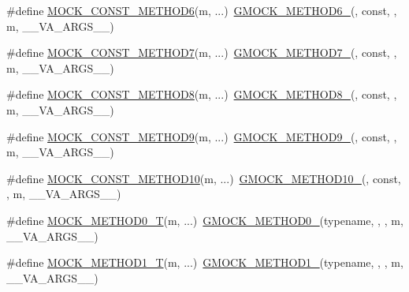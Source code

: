 \begin{DoxyCompactItemize}
\item 
\#define \hyperlink{gmock-generated-function-mockers_8h_a5081a185ba264d599357398952c23af1}{M\+O\+C\+K\+\_\+\+C\+O\+N\+S\+T\+\_\+\+M\+E\+T\+H\+O\+D6}(m, ...)~\hyperlink{gmock-generated-function-mockers_8h_ad0ca7f6973a076d0af4c953f8ed91842}{G\+M\+O\+C\+K\+\_\+\+M\+E\+T\+H\+O\+D6\+\_\+}(, const, , m, \+\_\+\+\_\+\+V\+A\+\_\+\+A\+R\+G\+S\+\_\+\+\_\+)
\item 
\#define \hyperlink{gmock-generated-function-mockers_8h_a0f0e63ed14beab1d85f0160bdbed9930}{M\+O\+C\+K\+\_\+\+C\+O\+N\+S\+T\+\_\+\+M\+E\+T\+H\+O\+D7}(m, ...)~\hyperlink{gmock-generated-function-mockers_8h_ab98a8399ba62b53b375c2807f4d39d2f}{G\+M\+O\+C\+K\+\_\+\+M\+E\+T\+H\+O\+D7\+\_\+}(, const, , m, \+\_\+\+\_\+\+V\+A\+\_\+\+A\+R\+G\+S\+\_\+\+\_\+)
\item 
\#define \hyperlink{gmock-generated-function-mockers_8h_a614ee58b7c9ab72e90c850d4bb97a502}{M\+O\+C\+K\+\_\+\+C\+O\+N\+S\+T\+\_\+\+M\+E\+T\+H\+O\+D8}(m, ...)~\hyperlink{gmock-generated-function-mockers_8h_aa84a36427c44505207b7cad5dec7ad67}{G\+M\+O\+C\+K\+\_\+\+M\+E\+T\+H\+O\+D8\+\_\+}(, const, , m, \+\_\+\+\_\+\+V\+A\+\_\+\+A\+R\+G\+S\+\_\+\+\_\+)
\item 
\#define \hyperlink{gmock-generated-function-mockers_8h_ab7429646bacf56a7d560a3d81d497880}{M\+O\+C\+K\+\_\+\+C\+O\+N\+S\+T\+\_\+\+M\+E\+T\+H\+O\+D9}(m, ...)~\hyperlink{gmock-generated-function-mockers_8h_aa820171a19cc587c247dbe05cbffc55f}{G\+M\+O\+C\+K\+\_\+\+M\+E\+T\+H\+O\+D9\+\_\+}(, const, , m, \+\_\+\+\_\+\+V\+A\+\_\+\+A\+R\+G\+S\+\_\+\+\_\+)
\item 
\#define \hyperlink{gmock-generated-function-mockers_8h_a4f16ede0ef660fb6dc49e5f5d226fbf9}{M\+O\+C\+K\+\_\+\+C\+O\+N\+S\+T\+\_\+\+M\+E\+T\+H\+O\+D10}(m, ...)~\hyperlink{gmock-generated-function-mockers_8h_a81a48223a8771de36ef92ac6d56f6e81}{G\+M\+O\+C\+K\+\_\+\+M\+E\+T\+H\+O\+D10\+\_\+}(, const, , m, \+\_\+\+\_\+\+V\+A\+\_\+\+A\+R\+G\+S\+\_\+\+\_\+)
\item 
\#define \hyperlink{gmock-generated-function-mockers_8h_a55a5a1a22cec416ead5605a2da39eec8}{M\+O\+C\+K\+\_\+\+M\+E\+T\+H\+O\+D0\+\_\+T}(m, ...)~\hyperlink{gmock-generated-function-mockers_8h_ae0d290ffa58d7c624b2e3487ba1252f4}{G\+M\+O\+C\+K\+\_\+\+M\+E\+T\+H\+O\+D0\+\_\+}(typename, , , m, \+\_\+\+\_\+\+V\+A\+\_\+\+A\+R\+G\+S\+\_\+\+\_\+)
\item 
\#define \hyperlink{gmock-generated-function-mockers_8h_a8e5b9539726be5c7a13f1aa3bcc1f29f}{M\+O\+C\+K\+\_\+\+M\+E\+T\+H\+O\+D1\+\_\+T}(m, ...)~\hyperlink{gmock-generated-function-mockers_8h_a1bc0012d62440dda77208dabdf4925c9}{G\+M\+O\+C\+K\+\_\+\+M\+E\+T\+H\+O\+D1\+\_\+}(typename, , , m, \+\_\+\+\_\+\+V\+A\+\_\+\+A\+R\+G\+S\+\_\+\+\_\+)

\end{DoxyCompactItemize}
